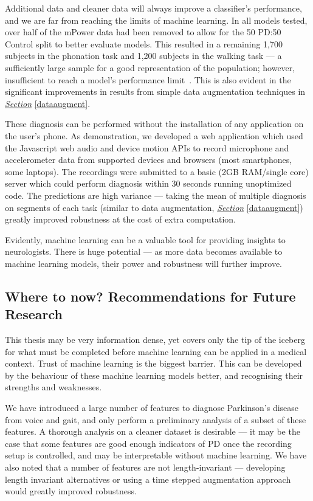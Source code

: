 \documentclass[12pt, twoside]{book}
\renewcommand\emph[1]{\textit{\color{USred}{#1}}}
\begin{document}
Additional data and cleaner data will always improve a classifier's performance, and we are far from reaching the limits of machine learning. In all models tested, over half of the mPower data had been removed to allow for the 50 PD:50 Control split to better evaluate models. This resulted in a remaining 1,700 subjects in the phonation task and 1,200 subjects in the walking task --- a sufficiently large sample for a good representation of the population; however, insufficient to reach a model's performance limit~\cite{cho2015much}. This is also evident in the significant improvements in results from simple data augmentation techniques in \textit{\hyperref[dataaugment]{Section}} \ref{dataaugment}. 


These diagnosis can be performed without the installation of any application on the user's phone. As demonstration, we developed a web application which used the Javascript web audio and device motion APIs to record microphone and accelerometer data from supported devices and browsers (most smartphones, some laptops). The recordings were submitted to a basic (2GB RAM/single core) server which could perform diagnosis within 30 seconds running unoptimized code. The predictions are high variance --- taking the mean of multiple diagnosis on segments of each task (similar to data augmentation, \textit{\hyperref[dataaugment]{Section}} \ref{dataaugment}) greatly improved robustness at the cost of extra computation.

Evidently, machine learning can be a valuable tool for providing insights to neurologists. There is huge potential --- as more data becomes available to machine learning models, their power and robustness will further improve. 

\subsection{Where to now? Recommendations for Future Research}

This thesis may be very information dense, yet covers only the tip of the iceberg for what must be completed before machine learning can be applied in a medical context. Trust of machine learning is the biggest barrier. This can be developed by \emph{understanding} the behaviour of these machine learning models better, and recognising their strengths and weaknesses.

We have introduced a large number of features to diagnose Parkinson's disease from voice and gait, and only perform a preliminary analysis of a subset of these features. A thorough analysis on a cleaner dataset is desirable --- it may be the case that some features are good enough indicators of PD once the recording setup is controlled, and may be interpretable without machine learning. We have also noted that a number of features are not length-invariant --- developing length invariant alternatives or using a time stepped augmentation approach would greatly improved robustness.
\end{document}
